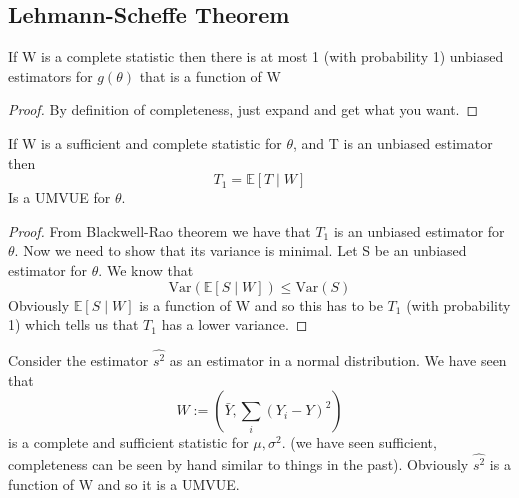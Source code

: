 \documentclass[../main.tex]{subfiles}
\begin{document}
\subsection{Lehmann-Scheffe Theorem}
\begin{claim}
If W is a complete statistic then there is at most 1 (with probability 1) unbiased estimators for $g(\theta)$ that is a function of W 
\end{claim}
\begin{proof}
By definition of completeness, just expand and get what you want.
\end{proof}
\begin{theorem}
If W is a sufficient and complete statistic for $\theta$, and T is an unbiased estimator then 
\[T_1 = \mathbb{E}[T\mid W]\]
Is a UMVUE for $\theta$. 
\end{theorem}
\begin{proof}
From Blackwell-Rao theorem we have that $T_1$ is an unbiased estimator for $\theta$. Now we need to show that its variance is minimal. Let S be an unbiased estimator for $\theta$. We know that 
\[\text{Var}(\mathbb{E}[S\mid W])\leq\text{Var}(S)\]
Obviously $\mathbb{E}[S\mid W]$ is a function of W and so this has to be $T_1$ (with probability 1) which tells us that $T_1$ has a lower variance. 
\end{proof}
\begin{example}
Consider the estimator $\hat{s^2}$ as an estimator in a normal distribution. We have seen that
\[W:=\left(\bar{Y}, \sum_i (Y_i-Y)^2\right)\]
is a complete and sufficient statistic for $\mu,\sigma^2$. (we have seen sufficient, completeness can be seen by hand similar to things in the past). Obviously $\hat{s^2}$ is a function of W and so it is a UMVUE. 
\end{example}
\end{document}
